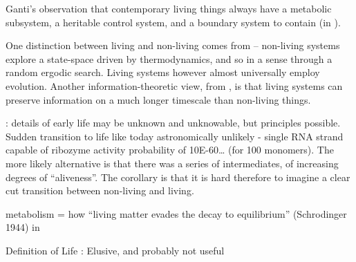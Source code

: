 
	Ganti's observation that contemporary living things always have a metabolic subsystem, a heritable control system, and a boundary system
	to contain (in \autocite{Szathmary:2006ty}).
	
	One distinction between living and non-living comes from \autocite{Rasmussen2004} -- non-living systems explore a state-space driven by thermodynamics, and so in a sense through a random ergodic search. Living systems however almost universally employ evolution. Another information-theoretic view, from \autocite{Adami2015}, is that living systems can preserve information on a much longer timescale than non-living things.
	
	\autocite{Pascal2013}: details of early life may be unknown and unknowable, but principles possible. Sudden transition to life like today astronomically unlikely - single RNA strand capable of ribozyme activity probability of 10E-60\ldots{} (for 100 monomers). The more likely alternative is that there was a series of intermediates, of increasing degrees of ``aliveness''. The corollary is that it is hard therefore to imagine a clear cut transition between non-living and living.
	
	metabolism = how ``living matter evades the decay to equilibrium'' (Schrodinger 1944) in \autocite{Pascal2013}
	
	Definition of Life  \autocite{Pascal2013}: Elusive, and probably not useful
	
